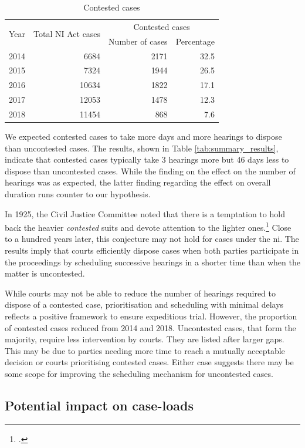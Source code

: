 \documentclass[12pt,a4paper]{article}
\begin{document}
\begin{longtable}{@{}lrrr@{}}
 \caption{Contested cases}\label{tab:cont_yearWise}\\
\toprule
\multirow{2}{*}{Year} & \multirow{2}{*}{Total NI Act cases} & \multicolumn{2}{c}{Contested cases}\\
\cmidrule{3-4}
&& Number of cases & Percentage \\
\midrule\endhead
2014 & 6684 & 2171 & 32.5 \\
2015 & 7324 & 1944 & 26.5 \\
2016 & 10634 & 1822 & 17.1 \\
2017 & 12053 & 1478 & 12.3 \\
2018 & 11454 & 868 & 7.6 \\
\bottomrule
\end{longtable}

We expected contested cases to take more days and more hearings to dispose than uncontested cases. The results, shown in Table \ref{tab:summary_results}, indicate that contested cases typically take 3 hearings more but 46 days less to dispose than uncontested cases. While the finding on the effect on the number of hearings was as expected, the latter finding regarding the effect on overall duration runs counter to our hypothesis.

In 1925, the Civil Justice Committee noted that there is a temptation to hold back the heavier \textit{contested} suits and devote attention to the lighter ones.\footcite{cg1925_civiljustice} Close to a hundred years later, this conjecture may not hold for cases under the \gls{ni}. The results imply that courts efficiently dispose cases when both parties participate in the proceedings by scheduling successive hearings in a shorter time than when the matter is uncontested.

While courts may not be able to reduce the number of hearings required to dispose of a contested case, prioritisation and scheduling with minimal delays reflects a positive framework to ensure expeditious trial. However, the proportion of contested cases reduced from 2014 and 2018. Uncontested cases, that form the majority, require less intervention by courts. They are listed after larger gaps. This may be due to parties needing more time to reach a mutually acceptable decision or courts prioritising contested cases. Either case suggests there may be some scope for improving the scheduling mechanism for uncontested cases.

\subsection{Potential impact on case-loads} \label{sec:impact-case-loads}
\end{document}
